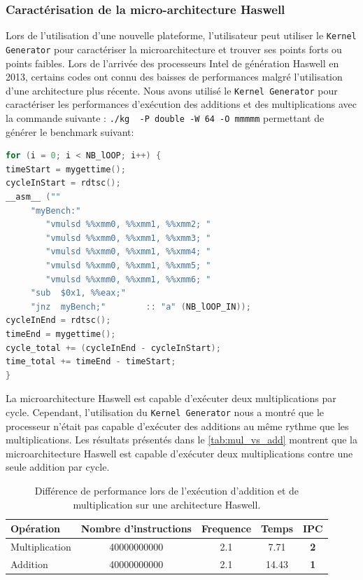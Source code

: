         




    
    \subsubsection{Caractérisation de la micro-architecture Haswell}
    Lors de l'utilisation d'une nouvelle plateforme, l'utilisateur peut utiliser le \verb|Kernel Generator| pour caractériser la microarchitecture et trouver ses points forts ou points faibles. Lors de l'arrivée des processeurs Intel de génération Haswell en 2013, certains codes ont connu des baisses de performances malgré l'utilisation d'une architecture plus récente. Nous avons utilisé le \verb|Kernel Generator| pour caractériser les performances d'exécution des additions et des multiplications avec la commande suivante : \verb|./kg  -P double -W 64 -O mmmmm| permettant de générer le benchmark suivant:
    
    \begin{minipage}{0.97\linewidth}         \begin{lstlisting}[label=lst:kg_mul ,language=C]
for (i = 0; i < NB_lOOP; i++) {
timeStart = mygettime();
cycleInStart = rdtsc();
__asm__ ("" 
     "myBench:"  
   		"vmulsd %%xmm0, %%xmm1, %%xmm2; "
   		"vmulsd %%xmm0, %%xmm1, %%xmm3; "
   		"vmulsd %%xmm0, %%xmm1, %%xmm4; "
   		"vmulsd %%xmm0, %%xmm1, %%xmm5; "
   		"vmulsd %%xmm0, %%xmm1, %%xmm6; "
     "sub  $0x1, %%eax;"
     "jnz  myBench;"		:: "a" (NB_lOOP_IN));
cycleInEnd = rdtsc();
timeEnd = mygettime();
cycle_total += (cycleInEnd - cycleInStart);
time_total += timeEnd - timeStart;
}
\end{lstlisting} \end{minipage}
    
     La microarchitecture Haswell est capable d'exécuter deux multiplications par cycle. Cependant, l'utilisation du \verb|Kernel Generator| nous a montré que le processeur n'était pas capable d'exécuter des additions au même rythme que les multiplications. Les résultats présentés dans le \autoref{tab:mul_vs_add} montrent que la microarchitecture Haswell est capable d'exécuter deux multiplications contre une seule addition par cycle.

    \begin{table}[h!]
    \centering
    \begin{tabular}{|l|c|c|c|c|}
        \hline
        Opération & Nombre d'instructions & Frequence & Temps & IPC \\ \hline
        Multiplication & 40000000000 & 2.1 & 7.71 & \textbf{2} \\ \hline
        Addition & 40000000000 & 2.1 & 14.43 & {\color[HTML]{963400} \textbf{1}} \\ \hline
        \end{tabular}%
        
        \caption{Différence de performance lors de l'exécution d'addition et de multiplication sur une architecture Haswell.}
        \label{tab:mul_vs_add}
    \end{table}
    
